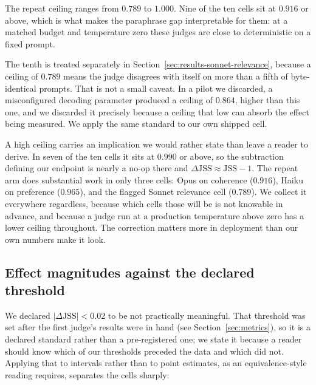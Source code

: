 The repeat ceiling ranges from $0.789$ to $1.000$. Nine of the ten cells sit at
$0.916$ or above, which is what makes the paraphrase gap interpretable for them:
at a matched budget and temperature zero these judges are close to deterministic
on a fixed prompt.

The tenth is treated separately in
Section~\ref{sec:results-sonnet-relevance}, because a ceiling of $0.789$ means
the judge disagrees with itself on more than a fifth of byte-identical prompts.
That is not a small caveat. In a pilot we discarded, a misconfigured decoding
parameter produced a ceiling of $0.864$, higher than this one, and we discarded
it precisely because a ceiling that low can absorb the effect being measured. We
apply the same standard to our own shipped cell.

A high ceiling carries an implication we would rather state than leave a reader
to derive. In seven of the ten cells it sits at $0.990$ or above, so the
subtraction defining our endpoint is nearly a no-op there and
$\Delta\mathrm{JSS} \approx \mathrm{JSS} - 1$. The repeat arm does substantial
work in only three cells: Opus on coherence ($0.916$), Haiku on preference
($0.965$), and the flagged Sonnet relevance cell ($0.789$). We collect it
everywhere regardless, because which cells those will be is not knowable in
advance, and because a judge run at a production temperature above zero has a
lower ceiling throughout. The correction matters more in deployment than our own
numbers make it look.

\subsection{Effect magnitudes against the declared threshold}
\label{sec:results-sesoi}

We declared $|\Delta\mathrm{JSS}| < 0.02$ to be not practically meaningful. That
threshold was set after the first judge's results were in hand (see
Section~\ref{sec:metrics}), so it is a declared standard rather than a
pre-registered one; we state it because a reader should know which of our
thresholds preceded the data and which did not. Applying that to intervals rather than to point estimates, as an
equivalence-style reading requires, separates the cells sharply:

